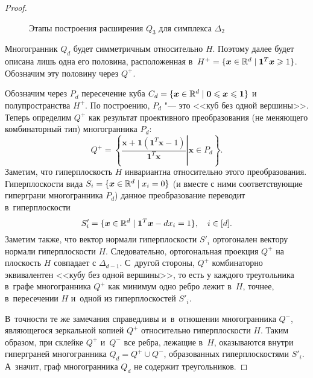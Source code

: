 \begin{proof}
\begin{figure}
\begin{minipage}{0.3\textwidth}
\end{minipage}
		\caption{Этапы построения расширения $Q_3$ для симплекса $\Delta_2$}
		\label{fig:1}
	\end{figure}
	
	Многогранник $Q_d$ будет симметричным относительно $H$.
	Поэтому далее будет описана лишь одна его половина,
	расположенная в~$H^+ = \{\bm{x} \in \mathbb{R}^d \mid \bm{1}^T \bm{x} \geqslant 1\}$.
	Обозначим эту половину через $Q^+$.
	
	Обозначим через $P_d$ пересечение куба
	$C_d = \{\bm{x}\in\mathbb{R}^d \mid \bm{0} \leqslant \bm{x} \leqslant \bm{1}\}$
	и полупространства $H^+$.
	По построению, $P_d$ "--- это <<куб без одной вершины>>.
	Теперь определим $Q^+$ как результат проективного преобразования
	(не меняющего комбинаторный тип) многогранника $P_d$:
	\[
	Q^+ = \left\{\left.\frac{\bm{x} + \bm{1} \left(\bm{1}^T \bm{x} - 1 \right)}{\bm{1}^T \bm{x}} \right| \bm{x}\in P_d\right\}.
	\]
	Заметим, что гиперплоскость $H$ инвариантна относительно этого преобразования.
	Гиперплоскости вида $S_i = \{\bm{x}\in\mathbb{R}^d \mid x_i = 0\}$ 
	(и вместе с ними соответствующие гиперграни многогранника $P_d$)
	данное преобразование переводит в~гиперплоскости 
	\begin{equation}
	\label{eq:Cube1}
	S'_i = \{\bm{x}\in\mathbb{R}^d \mid \bm{1}^T \bm{x} - d x_i = 1\}, \quad i\in[d].
	\end{equation}
	Заметим также, что вектор нормали гиперплоскости $S'_i$ ортогонален вектору нормали гиперплоскости $H$.
	Следовательно, ортогональная проекция $Q^+$ на плоскость $H$ совпадает с $\Delta_{d-1}$.
	С~другой стороны, $Q^+$ комбинаторно эквивалентен <<кубу без одной вершины>>,
	то есть у каждого треугольника в~графе многогранника $Q^+$ как минимум одно ребро лежит в~$H$,
	точнее, в~пересечении $H$ и~одной из гиперплоскостей $S'_i$.
	
	В~точности те же замечания справедливы и~в~отношении многогранника $Q^-$,
	являющегося зеркальной копией $Q^+$ относительно гиперплоскости $H$.
	Таким образом, при склейке $Q^+$ и~$Q^-$ все ребра, лежащие в~$H$, 
	оказываются внутри гиперграней многогранника $Q_d = Q^+ \cup Q^-$,
	образованных гиперплоскостями $S'_i$.
	А~значит, граф многогранника $Q_d$ не содержит треугольников.
\end{proof}

